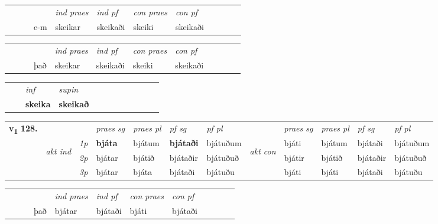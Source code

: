 \begin{tabular}{llllllllllll}
 & &  & &  \textit{ind praes} & \textit{ind pf} & \textit{con praes} & \textit{con pf} \\*
&  & & e-m & skeikar & skeikaði & skeiki & skeikaði \\*
\cmidrule{5-9}
\end{tabular}


\begin{tabular}{llllllllllll}
 & &  & &  \textit{ind praes} & \textit{ind pf} & \textit{con praes} & \textit{con pf} \\*
&  & & það & skeikar & skeikaði & skeiki & skeikaði \\*
\cmidrule{5-9}
\end{tabular}


\begin{tabular}{llllllllllll}
 & & \textit{inf}      & \textit{supin}       \\*
  & & \textbf{skeika}       &  \textbf{skeikað}   \\*
\cmidrule{1-12}
\end{tabular}



\begin{tabular}{llllllllllll} \toprule
\multirow{4}{*}{{{\textbf{v{\textsubscript{1}}} \Large{\textbf{128.}}}}}  & &   &  \textit{praes sg}  & \textit{praes pl}  &\textit{ pf sg} & \textit{pf pl} &  &  \textit{praes sg}  & \textit{praes pl}  & \textit{pf sg} & \textit{pf pl } \\*
	\cmidrule{4-7} \cmidrule{9-12}
 & \multirow{3}{*}{\begin{turn}{90}\textit{akt ind}\end{turn}} & {\textit{1p}} & \textbf{bjáta} & bjátum    & \textbf{bjátaði} & bjátuðum & \multirow{3}{*}{\begin{turn}{90}\textit{akt con}\end{turn}} &bjáti & bjátum & bjátaði & bjátuðum\\*
& &  {\textit{2p}} &  bjátar  & bjátið   & bjátaðir & bjátuðuð & & bjátir & bjátið & bjátaðir & bjátuðuð \\*
& &  {\textit{3p}} & bjátar & bjáta   & bjátaði & bjátuðu & & bjáti & bjáti& bjátaði & bjátuðu  \\*
\cmidrule{4-7} \cmidrule{9-12}
\end{tabular}


\begin{tabular}{llllllllllll}
 & &  & &  \textit{ind praes} & \textit{ind pf} & \textit{con praes} & \textit{con pf} \\*
&  & & það & bjátar & bjátaði & bjáti & bjátaði \\*
\cmidrule{5-9}
\end{tabular}


